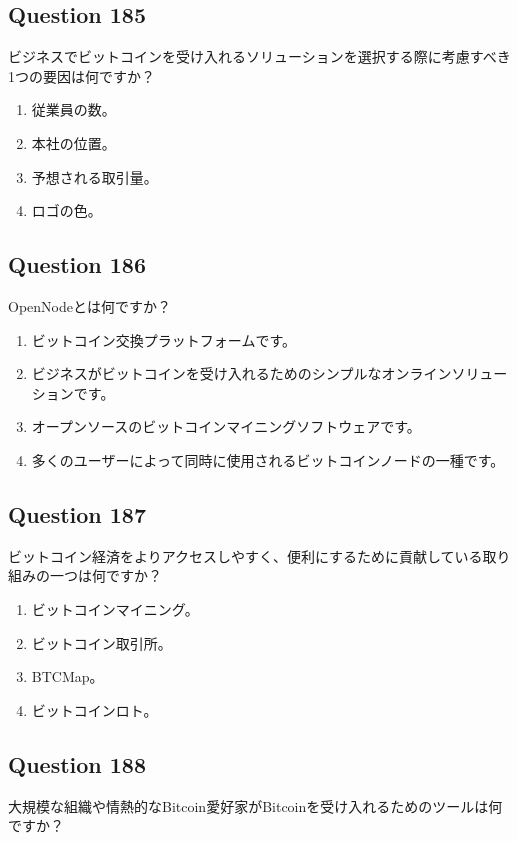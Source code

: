 \documentclass[12pt,a4paper]{article}
\begin{document}
\bigskip


\subsection*{Question 185}
ビジネスでビットコインを受け入れるソリューションを選択する際に考慮すべき1つの要因は何ですか？

\begin{enumerate}[label=\Alph*., leftmargin=*]
\item 従業員の数。
\item 本社の位置。
\item 予想される取引量。
\item ロゴの色。
\end{enumerate}

\bigskip


\subsection*{Question 186}
OpenNodeとは何ですか？

\begin{enumerate}[label=\Alph*., leftmargin=*]
\item ビットコイン交換プラットフォームです。
\item ビジネスがビットコインを受け入れるためのシンプルなオンラインソリューションです。
\item オープンソースのビットコインマイニングソフトウェアです。
\item 多くのユーザーによって同時に使用されるビットコインノードの一種です。
\end{enumerate}

\bigskip


\subsection*{Question 187}
ビットコイン経済をよりアクセスしやすく、便利にするために貢献している取り組みの一つは何ですか？

\begin{enumerate}[label=\Alph*., leftmargin=*]
\item ビットコインマイニング。
\item ビットコイン取引所。
\item BTCMap。
\item ビットコインロト。
\end{enumerate}

\bigskip


\subsection*{Question 188}
大規模な組織や情熱的なBitcoin愛好家がBitcoinを受け入れるためのツールは何ですか？
\end{document}
